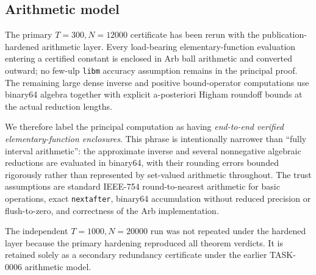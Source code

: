 \subsection{Arithmetic model}
\label{subsec:arithmetic-model}

The primary \(T=300,N=12000\) certificate has been rerun with the publication-hardened arithmetic layer. Every load-bearing elementary-function evaluation entering a certified constant is enclosed in Arb ball arithmetic and converted outward; no few-ulp \texttt{libm} accuracy assumption remains in the principal proof. The remaining large dense inverse and positive bound-operator computations use binary64 algebra together with explicit a-posteriori Higham roundoff bounds at the actual reduction lengths.

We therefore label the principal computation as having \emph{end-to-end verified elementary-function enclosures}. This phrase is intentionally narrower than ``fully interval arithmetic'': the approximate inverse and several nonnegative algebraic reductions are evaluated in binary64, with their rounding errors bounded rigorously rather than represented by set-valued arithmetic throughout. The trust assumptions are standard IEEE-754 round-to-nearest arithmetic for basic operations, exact \texttt{nextafter}, binary64 accumulation without reduced precision or flush-to-zero, and correctness of the Arb implementation.

The independent \(T=1000,N=20000\) run was not repeated under the hardened layer because the primary hardening reproduced all theorem verdicts. It is retained solely as a secondary redundancy certificate under the earlier TASK-0006 arithmetic model.
